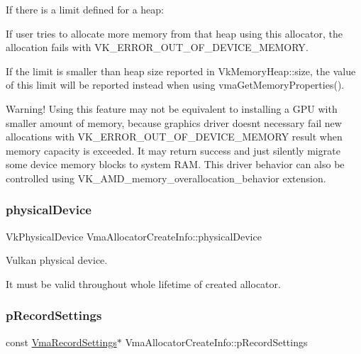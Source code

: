 If there is a limit defined for a heap\+:


\begin{DoxyItemize}
\item If user tries to allocate more memory from that heap using this allocator, the allocation fails with {\ttfamily V\+K\+\_\+\+E\+R\+R\+O\+R\+\_\+\+O\+U\+T\+\_\+\+O\+F\+\_\+\+D\+E\+V\+I\+C\+E\+\_\+\+M\+E\+M\+O\+RY}.
\item If the limit is smaller than heap size reported in {\ttfamily Vk\+Memory\+Heap\+::size}, the value of this limit will be reported instead when using vma\+Get\+Memory\+Properties().
\end{DoxyItemize}

Warning! Using this feature may not be equivalent to installing a G\+PU with smaller amount of memory, because graphics driver doesn\textquotesingle{}t necessary fail new allocations with {\ttfamily V\+K\+\_\+\+E\+R\+R\+O\+R\+\_\+\+O\+U\+T\+\_\+\+O\+F\+\_\+\+D\+E\+V\+I\+C\+E\+\_\+\+M\+E\+M\+O\+RY} result when memory capacity is exceeded. It may return success and just silently migrate some device memory blocks to system R\+AM. This driver behavior can also be controlled using V\+K\+\_\+\+A\+M\+D\+\_\+memory\+\_\+overallocation\+\_\+behavior extension. \mbox{\label{structVmaAllocatorCreateInfo_a08230f04ae6ccf8a78150a9e829a7156}} 
\subsubsection{\texorpdfstring{physical\+Device}{physicalDevice}}
{\footnotesize\ttfamily Vk\+Physical\+Device Vma\+Allocator\+Create\+Info\+::physical\+Device}



Vulkan physical device. 

It must be valid throughout whole lifetime of created allocator. \mbox{\label{structVmaAllocatorCreateInfo_ace2aa4877b16a42b0b7673d4e26000ee}} 
\subsubsection{\texorpdfstring{p\+Record\+Settings}{pRecordSettings}}
{\footnotesize\ttfamily const \hyperlink{structVmaRecordSettings}{Vma\+Record\+Settings}$\ast$ Vma\+Allocator\+Create\+Info\+::p\+Record\+Settings}



